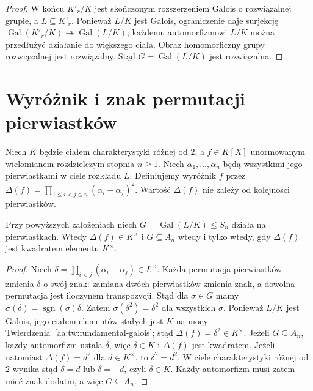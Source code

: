 \begin{proof}
W końcu $K'_r/K$ jest skończonym rozszerzeniem Galois
o rozwiązalnej grupie, a $L\subseteq K'_r$.
Ponieważ $L/K$ jest Galois, ograniczenie daje
surjekcję $\operatorname{Gal}(K'_r/K)\twoheadrightarrow
\operatorname{Gal}(L/K)$; każdemu automorfizmowi $L/K$
można przedłużyć działanie do większego ciała.
Obraz homomorficzny grupy rozwiązalnej jest rozwiązalny.
Stąd $G=\operatorname{Gal}(L/K)$ jest rozwiązalna.
\end{proof}

\section{Wyróżnik i znak permutacji pierwiastków}
\begin{definicja}
\label{aa:def:polynomial-discriminant-galois}
Niech $K$ będzie ciałem charakterystyki różnej od $2$,
a $f\in K[X]$ unormowanym wielomianem rozdzielczym
stopnia $n\ge1$. Niech $\alpha_1,\ldots,\alpha_n$
będą wszystkimi jego pierwiastkami w ciele rozkładu $L$.
Definiujemy wyróżnik $f$ przez
$\Delta(f)=\prod_{1\le i<j\le n}(\alpha_i-\alpha_j)^2$.
Wartość $\Delta(f)$ nie zależy od kolejności pierwiastków.
\end{definicja}

\begin{twierdzenie}
\label{aa:tw:galois-discriminant-sign}
Przy powyższych założeniach niech
$G=\operatorname{Gal}(L/K)\le S_n$ działa na pierwiastkach.
Wtedy $\Delta(f)\in K^\times$ i
$G\subseteq A_n$ wtedy i tylko wtedy, gdy $\Delta(f)$
jest kwadratem elementu $K^\times$.
\end{twierdzenie}
\begin{proof}
Niech $\delta=\prod_{i<j}(\alpha_i-\alpha_j)\in L^\times$.
Każda permutacja pierwiastków zmienia $\delta$
o swój znak: zamiana dwóch pierwiastków zmienia znak,
a dowolna permutacja jest iloczynem transpozycji.
Stąd dla $\sigma\in G$ mamy
$\sigma(\delta)=\operatorname{sgn}(\sigma)\delta$.
Zatem $\sigma(\delta^2)=\delta^2$ dla wszystkich $\sigma$.
Ponieważ $L/K$ jest Galois, jego ciałem elementów
stałych jest $K$ na mocy
Twierdzenia~\ref{aa:tw:fundamental-galois}; stąd
$\Delta(f)=\delta^2\in K^\times$.
Jeżeli $G\subseteq A_n$, każdy automorfizm ustala
$\delta$, więc $\delta\in K$ i $\Delta(f)$ jest kwadratem.
Jeżeli natomiast $\Delta(f)=d^2$ dla $d\in K^\times$,
to $\delta^2=d^2$. W ciele charakterystyki różnej od $2$
wynika stąd $\delta=d$ lub $\delta=-d$, czyli $\delta\in K$.
Każdy automorfizm musi zatem mieć znak dodatni,
a więc $G\subseteq A_n$.
\end{proof}

